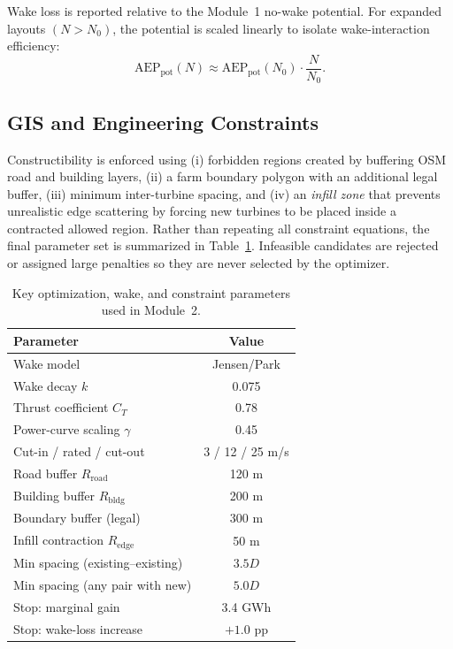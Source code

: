 \documentclass[lettersize,journal]{IEEEtran}
\begin{document}
Wake loss is reported relative to the Module~1 no-wake potential. For expanded layouts $(N>N_0)$, the potential is scaled linearly to isolate wake-interaction efficiency:
\begin{equation}
\mathrm{AEP}_{\text{pot}}(N) \approx \mathrm{AEP}_{\text{pot}}(N_0)\cdot\frac{N}{N_0}.
\label{eq:m2_potential_scale}
\end{equation}

\subsection{GIS and Engineering Constraints}
Constructibility is enforced using (i) forbidden regions created by buffering OSM road and building layers, (ii) a farm boundary polygon with an additional legal buffer, (iii) minimum inter-turbine spacing, and (iv) an \emph{infill zone} that prevents unrealistic edge scattering by forcing new turbines to be placed inside a contracted allowed region. Rather than repeating all constraint equations, the final parameter set is summarized in Table~\ref{tab:m2_params}. Infeasible candidates are rejected or assigned large penalties so they are never selected by the optimizer.

\begin{table}[H]
\caption{Key optimization, wake, and constraint parameters used in Module~2.}
\label{tab:m2_params}
\centering
\renewcommand{\arraystretch}{1.1}
\begin{tabular}{lc}
\hline
\textbf{Parameter} & \textbf{Value} \\
\hline
Wake model & Jensen/Park \cite{shakoor2016jensenreview,katic1987jensen} \\
Wake decay $k$ & 0.075 \\
Thrust coefficient $C_T$ & 0.78 \\
Power-curve scaling $\gamma$ & 0.45 \\
Cut-in / rated / cut-out & 3 / 12 / 25 m/s \\
Road buffer $R_{\text{road}}$ & 120 m \\
Building buffer $R_{\text{bldg}}$ & 200 m \\
Boundary buffer (legal) & 300 m \\
Infill contraction $R_{\text{edge}}$ & 50 m \\
Min spacing (existing--existing) & $3.5D$ \\
Min spacing (any pair with new) & $5.0D$ \\
Stop: marginal gain & 3.4 GWh \\
Stop: wake-loss increase & $+1.0$ pp \\
\hline
\end{tabular}
\end{table}
\end{document}
